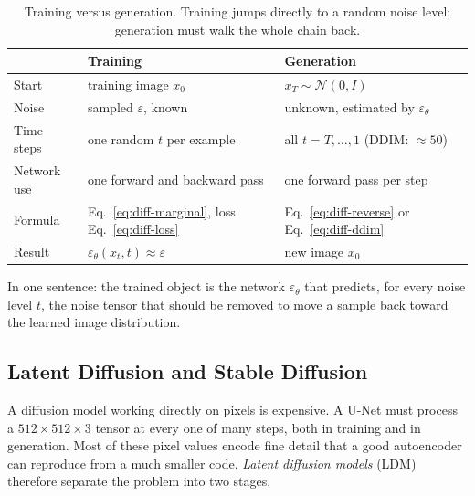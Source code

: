 \begin{table}[ht]
  \centering
  \begin{tabular}{@{}p{2.5cm}p{5.6cm}p{5.6cm}@{}}
    \toprule
    & Training & Generation \\
    \midrule
    Start & training image $x_0$ & $x_T\sim\mathcal N(0,I)$ \\
    Noise & sampled $\varepsilon$, known & unknown, estimated by
      $\varepsilon_\theta$ \\
    Time steps & one random $t$ per example & all $t=T,\dots,1$ (DDIM: ${\approx}50$) \\
    Network use & one forward and backward pass & one forward pass per step \\
    Formula & Eq.~\ref{eq:diff-marginal}, loss Eq.~\ref{eq:diff-loss} &
      Eq.~\ref{eq:diff-reverse} or Eq.~\ref{eq:diff-ddim} \\
    Result & $\varepsilon_\theta(x_t,t)\approx\varepsilon$ & new image $x_0$ \\
    \bottomrule
  \end{tabular}
  \caption{Training versus generation. Training jumps directly to a random
  noise level; generation must walk the whole chain back.}
  \label{tab:diff-train-vs-sample}
\end{table}

\noindent
In one sentence: the trained object is the network $\varepsilon_\theta$ that
predicts, for every noise level $t$, the noise tensor that should be removed to
move a sample back toward the learned image distribution.

\subsection{Latent Diffusion and Stable Diffusion}

A diffusion model working directly on pixels is expensive. A U-Net must
process a $512\times512\times3$ tensor at every one of many steps, both in
training and in generation. Most of these pixel values encode fine detail that
a good autoencoder can reproduce from a much smaller code. \emph{Latent
diffusion models} (LDM) therefore separate the problem into two stages.

